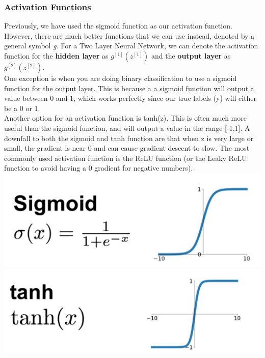 \documentclass[11pt, a4paper]{article}
\begin{document}
\begin{spacing}{1.1}
	\subsubsection{Activation Functions}
	Previously, we have used the sigmoid function as our activation function. However, there are much better functions that we can use instead, denoted by a general symbol \textit{g}. For a Two Layer Neural Network, we can denote the activation function for the \textbf{hidden layer} as $g^{[1]}(z^{[1]})$ and the \textbf{output layer} as $g^{[2]}(z^{[2]})$. \vspace*{2mm} \\
	One exception is when you are doing binary classification to use a sigmoid function for the output layer. This is because a a sigmoid function will output a value between 0 and 1, which works perfectly since our true labels (y) will either be a 0 or 1. \vspace*{2mm} \\
	Another option for an activation function is tanh(z). This is often much more useful than the sigmoid function, and will output a value in the range [-1,1]. A downfall to both the sigmoid and tanh function are that when z is very large or small, the gradient is near 0 and can cause gradient descent to slow. The most commonly used activation function is the ReLU function (or the Leaky ReLU function to avoid having a 0 gradient for negative numbers). \vspace*{2mm} \\
	\hspace*{24mm} \includegraphics[scale=0.3]{sigmoid} \hspace*{15mm} \includegraphics[scale=0.3]{tanh} \\

\end{spacing}
\end{document}
